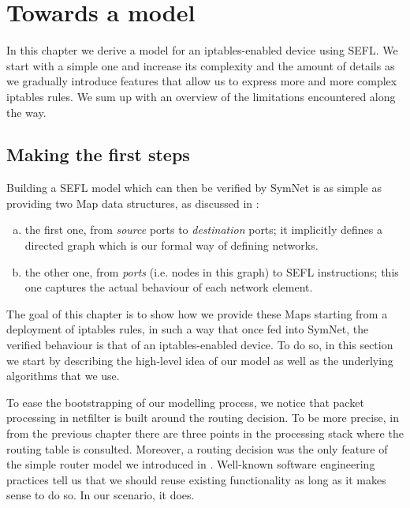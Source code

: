 \chapter{Towards a model}\label{chapter:model}
In this chapter we derive a model for an iptables-enabled device using SEFL.
We start with a simple one and increase its complexity and the amount of
details as we gradually introduce features that allow us to express more and
more complex iptables rules.  We sum up with an overview of the limitations
encountered along the way.


\section{Making the first steps}\label{sec:first-steps}

Building a SEFL model which can then be verified by SymNet is as simple as
providing two Map data structures, as discussed in
:
\begin{enumerate}[a)]
  \item the first one, from \emph{source} ports to \emph{destination} ports; it
    implicitly defines a directed graph which is our formal way of defining
    networks.
  \item the other one, from \emph{ports} (i.e. nodes in this graph) to SEFL
    instructions; this one captures the actual behaviour of each network
    element.
\end{enumerate}

The goal of this chapter is to show how we provide these Maps starting from a
deployment of iptables rules, in such a way that once fed into SymNet, the
verified behaviour is that of an iptables-enabled device.  To do so, in this
section we start by describing the high-level idea of our model as well as the
underlying algorithms that we use.

\bigskip

To ease the bootstrapping of our modelling process, we notice that packet
processing in netfilter is built around the routing decision.  To be more
precise, in  from the previous
chapter there are three points in the processing stack where the routing table
is consulted.  Moreover, a routing decision was the only feature of the simple
router model we introduced in .
Well-known software engineering practices tell us that we should reuse existing
functionality as long as it makes sense to do so.  In our scenario, it does.

